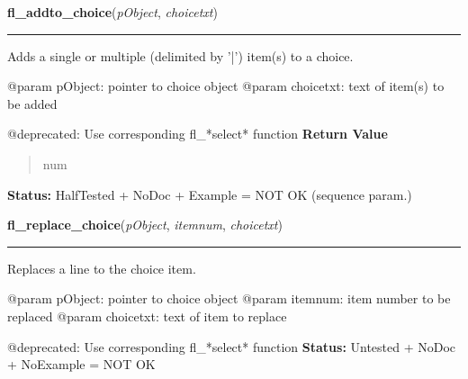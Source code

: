     \label{xformslib:deprecated:fl_addto_choice}

    \vspace{0.5ex}

\hspace{.8\funcindent}\begin{boxedminipage}{\funcwidth}

    \raggedright \textbf{fl\_addto\_choice}(\textit{pObject}, \textit{choicetxt})

    \vspace{-1.5ex}

    \rule{\textwidth}{0.5\fboxrule}
\setlength{\parskip}{2ex}

Adds a single or multiple (delimited by '|') item(s) to a choice.

@param pObject: pointer to choice object
@param choicetxt: text of item(s) to be added

@deprecated: Use corresponding fl\_*select* function
\setlength{\parskip}{1ex}
      \textbf{Return Value}
    \vspace{-1ex}

      \begin{quote}

num
      \end{quote}

\textbf{Status:} 
HalfTested + NoDoc + Example = NOT OK (sequence param.)


    \end{boxedminipage}

    \label{xformslib:deprecated:fl_replace_choice}

    \vspace{0.5ex}

\hspace{.8\funcindent}\begin{boxedminipage}{\funcwidth}

    \raggedright \textbf{fl\_replace\_choice}(\textit{pObject}, \textit{itemnum}, \textit{choicetxt})

    \vspace{-1.5ex}

    \rule{\textwidth}{0.5\fboxrule}
\setlength{\parskip}{2ex}

Replaces a line to the choice item.

@param pObject: pointer to choice object
@param itemnum: item number to be replaced
@param choicetxt: text of item to replace

@deprecated: Use corresponding fl\_*select* function
\setlength{\parskip}{1ex}
\textbf{Status:} 
Untested + NoDoc + NoExample = NOT OK


    \end{boxedminipage}


